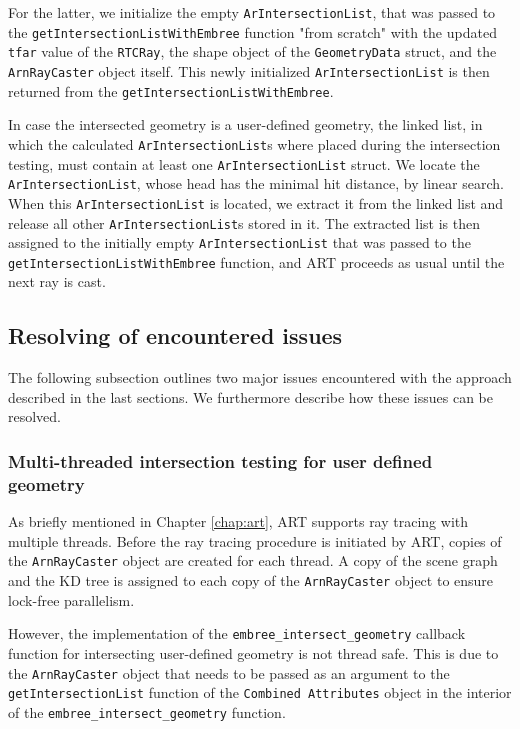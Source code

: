 For the latter, we initialize the empty \texttt{ArIntersectionList}, that was passed to the \texttt{getIntersectionListWithEmbree} function "from scratch" with the updated \texttt{tfar} value of the \texttt{RTCRay}, the shape object of the \texttt{GeometryData} struct, and the \texttt{ArnRayCaster} object itself. This newly initialized \texttt{ArIntersectionList} is then returned from the \texttt{getIntersectionListWithEmbree}.

In case the intersected geometry is a user-defined geometry, the linked list, in which the calculated \texttt{ArIntersectionList}s where placed during the intersection testing, must contain at least one \texttt{ArIntersectionList} struct. We locate the \texttt{ArIntersectionList}, whose head has the minimal hit distance, by linear search. When this \texttt{ArIntersectionList} is located, we extract it from the linked list and release all other \texttt{ArIntersectionList}s stored in it. The extracted list is then assigned to the initially empty \texttt{ArIntersectionList} that was passed to the \texttt{getIntersectionListWithEmbree} function, and ART proceeds as usual until the next ray is cast.


\subsection{Resolving of encountered issues}
\label{sec:issues_user}
The following subsection outlines two major issues encountered with the approach described in the last sections. We furthermore describe how these issues can be resolved.

\subsubsection{Multi-threaded intersection testing for user defined geometry}
As briefly mentioned in Chapter \ref{chap:art}, ART supports ray tracing with multiple threads.
Before the ray tracing procedure is initiated by ART, copies of the \texttt{ArnRayCaster} object are created for each thread. A copy of the scene graph and the KD tree is assigned to each copy of the \texttt{ArnRayCaster} object to ensure lock-free parallelism.

However, the implementation of the \texttt{embree\_intersect\_geometry} callback function for intersecting user-defined geometry is not thread safe. This is due to the \texttt{ArnRayCaster} object that needs to be passed as an argument to the \texttt{getIntersectionList} function of the \texttt{Combined Attributes} object in the interior of the \texttt{embree\_intersect\_geometry} function.

